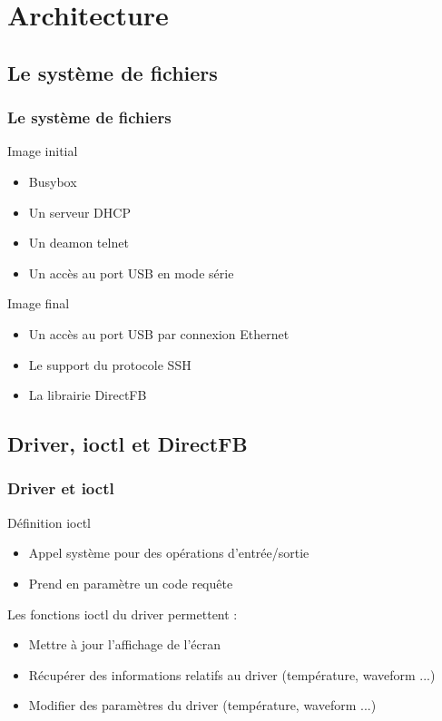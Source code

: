 \section{Architecture}
\subsection{Le système de fichiers}
\begin{frame}
\frametitle{Le système de fichiers}

\begin{block}{Image initial}
\begin{itemize}
\item Busybox
\item Un serveur DHCP
\item Un deamon telnet
\item Un accès au port USB en mode série 
\end{itemize}
\end{block}

\begin{block}{Image final}
\begin{itemize}
\item Un accès au port USB par connexion Ethernet
\item Le support du protocole SSH
\item La librairie DirectFB
\end{itemize}
\end{block}

\end{frame}

\subsection{Driver, ioctl et DirectFB}

\begin{frame}
\frametitle{Driver et ioctl}

\begin{block}{Définition ioctl}
\begin{itemize}
\item Appel système pour des opérations d'entrée/sortie
\item Prend en paramètre un code requête
\end{itemize}
\end{block}
\begin{block}{Les fonctions ioctl du driver permettent :}
\begin{itemize}
\item Mettre à jour l'affichage de l'écran
\item Récupérer des informations relatifs au driver (température, waveform ...)
\item Modifier des paramètres du driver (température, waveform ...)
\end{itemize}
\end{block}

\end{frame}

